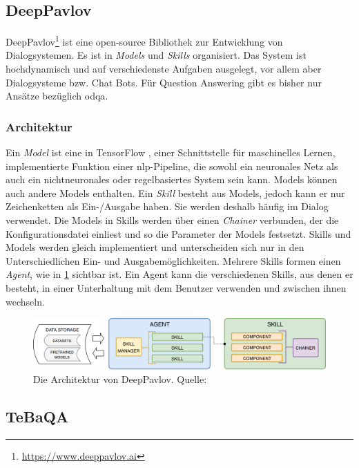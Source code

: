 \subsection{DeepPavlov}
DeepPavlov\footnote{\url{https://www.deeppavlov.ai}} \citep{deeppavlov} ist eine open-source Bibliothek zur Entwicklung von Dialogsystemen.
Es ist in \emph{Models} und \emph{Skills} organisiert.
Das System ist hochdynamisch und auf verschiedenste Aufgaben ausgelegt, vor allem aber Dialogsysteme bzw. Chat Bots.
Für Question Answering gibt es bisher nur Ansätze bezüglich \ac{odqa}.

\subsubsection{Architektur}
Ein \emph{Model} ist eine in TensorFlow \citep{tensorflow}, einer Schnittstelle für maschinelles Lernen, implementierte Funktion einer \ac{nlp}-Pipeline,
die sowohl ein neuronales Netz als auch ein nichtneuronales oder regelbasiertes System sein kann.
Models können auch andere Models enthalten.
Ein \emph{Skill} besteht aus Models, jedoch kann er nur Zeichenketten als Ein-/Ausgabe haben.
Sie werden deshalb häufig im Dialog verwendet.
Die Models in Skills werden über einen \emph{Chainer} verbunden, der die Konfigurationsdatei einliest und so die Parameter der Models festsetzt.
Skills und Models werden gleich implementiert und unterscheiden sich nur in den Unterschiedlichen Ein- und Ausgabemöglichkeiten.
Mehrere Skills formen einen \emph{Agent}, wie in \cref{fig:deeppavlov-architektur} sichtbar ist.
Ein Agent kann die verschiedenen Skills, aus denen er besteht, in einer Unterhaltung mit dem Benutzer verwenden und zwischen ihnen wechseln.

\begin{figure}[htbp!]
\centering
\includegraphics[width=\textwidth, height=\textheight, keepaspectratio]{Images/DeepPavlovArchitecture.png}
\caption[DeepPavlov Architektur]{Die Architektur von DeepPavlov. Quelle: \citet{deeppavlov}}
\label{fig:deeppavlov-architektur}
\end{figure}

\subsection{TeBaQA}

